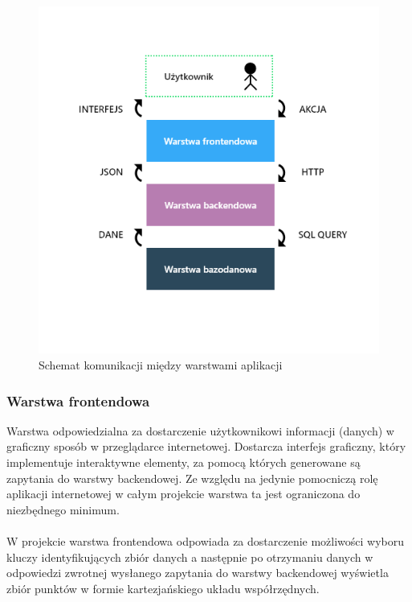 \documentclass[eng,printmode]{mgr}
\begin{document}
\begin{figure}[H]
  \begin{center}
  \includegraphics[scale=0.7]{layers}
  \end{center}
  \caption{Schemat komunikacji między warstwami aplikacji}
\end{figure}

\subsubsection{Warstwa frontendowa}
Warstwa odpowiedzialna za dostarczenie użytkownikowi informacji (danych) w graficzny sposób w przeglądarce internetowej. Dostarcza interfejs graficzny, który implementuje interaktywne elementy, za pomocą których generowane są zapytania do warstwy backendowej. Ze względu na jedynie pomocniczą rolę aplikacji internetowej w całym projekcie warstwa ta jest ograniczona do niezbędnego minimum.
\\\\
W projekcie warstwa frontendowa odpowiada za dostarczenie możliwości wyboru  kluczy identyfikujących zbiór danych a następnie po otrzymaniu danych w odpowiedzi zwrotnej wysłanego zapytania do warstwy backendowej wyświetla zbiór punktów w formie kartezjańskiego układu współrzędnych.
\end{document}
